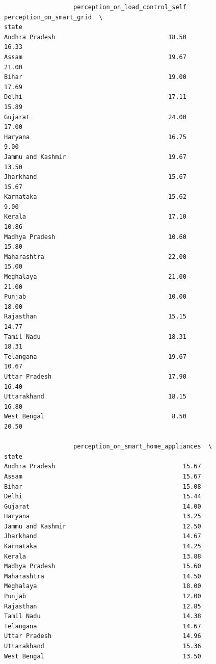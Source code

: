 \documentclass[
  letterpaper,
  DIV=11,
  numbers=noendperiod]{scrartcl}
\begin{document}
\begin{verbatim}
                   perception_on_load_control_self  perception_on_smart_grid  \
state                                                                          
Andhra Pradesh                               18.50                     16.33   
Assam                                        19.67                     21.00   
Bihar                                        19.00                     17.69   
Delhi                                        17.11                     15.89   
Gujarat                                      24.00                     17.00   
Haryana                                      16.75                      9.00   
Jammu and Kashmir                            19.67                     13.50   
Jharkhand                                    15.67                     15.67   
Karnataka                                    15.62                      9.00   
Kerala                                       17.10                     10.86   
Madhya Pradesh                               10.60                     15.80   
Maharashtra                                  22.00                     15.00   
Meghalaya                                    21.00                     21.00   
Punjab                                       10.00                     18.00   
Rajasthan                                    15.15                     14.77   
Tamil Nadu                                   18.31                     18.31   
Telangana                                    19.67                     10.67   
Uttar Pradesh                                17.90                     16.40   
Uttarakhand                                  18.15                     16.80   
West Bengal                                   8.50                     20.50   

                   perception_on_smart_home_appliances  \
state                                                    
Andhra Pradesh                                   15.67   
Assam                                            15.67   
Bihar                                            15.08   
Delhi                                            15.44   
Gujarat                                          14.00   
Haryana                                          13.25   
Jammu and Kashmir                                12.50   
Jharkhand                                        14.67   
Karnataka                                        14.25   
Kerala                                           13.88   
Madhya Pradesh                                   15.60   
Maharashtra                                      14.50   
Meghalaya                                        18.00   
Punjab                                           12.00   
Rajasthan                                        12.85   
Tamil Nadu                                       14.38   
Telangana                                        14.67   
Uttar Pradesh                                    14.96   
Uttarakhand                                      15.36   
West Bengal                                      13.50   


\end{verbatim}
\end{document}
